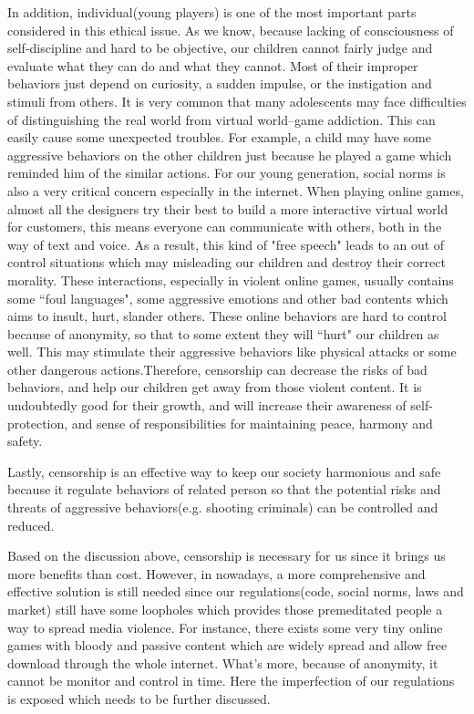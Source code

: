 In addition, individual(young players) is one of the most important parts considered in this ethical issue. As we know, because lacking of consciousness of self-discipline and hard to be objective, our children cannot fairly judge and evaluate what they can do and what they cannot. Most of their improper behaviors just depend on curiosity,  a sudden impulse, or the instigation and stimuli from others. It is very common that many adolescents may face difficulties of distinguishing the real world from virtual world--game addiction. This can easily cause some unexpected troubles. For example, a child may have some aggressive behaviors on the other children just because he played a game which reminded him of the similar actions. For our young generation, social norms is also a very critical concern especially in the internet. When playing online games, almost all the designers try their best to build a more interactive virtual world for customers, this means everyone can communicate with others, both in the way of text and voice. As a result, this kind of "free speech" leads to an out of control situations which may misleading our children and destroy their correct morality. These interactions, especially in violent online games, usually contains some ``foul languages", some aggressive emotions and other bad contents which aims to insult, hurt, slander others. These online behaviors are hard to control because of anonymity, so that to some extent they will ``hurt" our children as well. This may stimulate their aggressive behaviors like physical attacks or some other dangerous actions.Therefore, censorship can decrease the risks of bad behaviors, and help our children get away from those violent content. It is undoubtedly good for their growth, and will increase their awareness of self-protection, and sense of responsibilities for  maintaining peace, harmony and safety.

Lastly, censorship is an effective way to keep our society harmonious and safe because it regulate behaviors of related person so that the potential risks and threats of aggressive behaviors(e.g. shooting criminals) can be controlled and reduced.

Based on the discussion above, censorship is necessary for us since it brings us more benefits than cost.  However, in nowadays, a more comprehensive and effective solution is still needed since our regulations(code, social norms, laws and market) still have some loopholes which provides those premeditated people a way to spread media violence. For instance, there exists some very tiny online games with bloody and passive content which are widely spread and allow free download through the whole internet. What's more, because of anonymity, it cannot be monitor and control in time. Here the imperfection of our regulations is exposed which needs to be further discussed.









